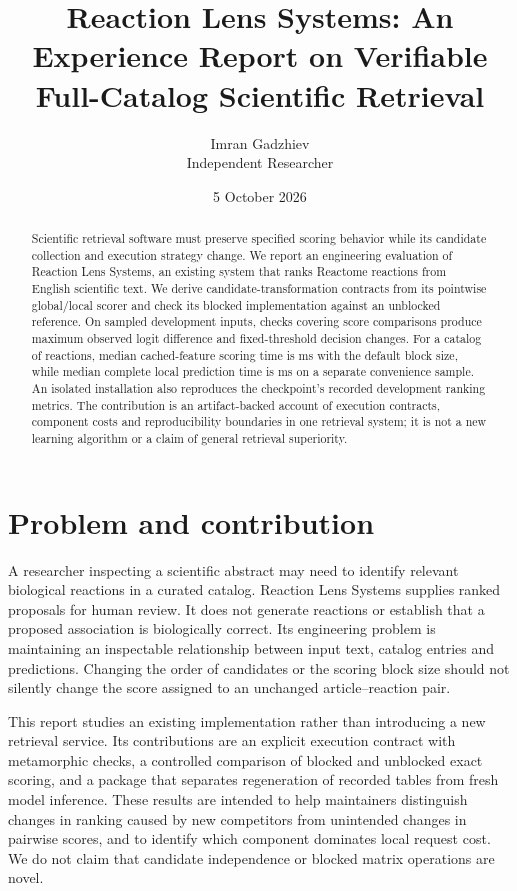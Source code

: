 \documentclass[11pt,a4paper]{article}
\title{Reaction Lens Systems: An Experience Report on Verifiable Full-Catalog Scientific Retrieval}
\author{Imran Gadzhiev\\Independent Researcher}
\date{5 October 2026}
\begin{document}
\maketitle
\begin{abstract}
Scientific retrieval software must preserve specified scoring behavior while its
candidate collection and execution strategy change. We report an engineering
evaluation of Reaction Lens Systems, an existing system that ranks Reactome reactions from
English scientific text. We derive candidate-transformation contracts from its
pointwise global/local scorer and check its blocked implementation against an
unblocked reference. On sampled development inputs, \ContractChecks{} checks
covering \ScoreComparisons{} score comparisons produce maximum observed logit
difference \MaxError{} and \DecisionFlips{} fixed-threshold decision changes.
For a catalog of \CatalogCount{} reactions, median cached-feature scoring time is
\DefaultMedian{} ms with the default block size, while median complete local
prediction time is \EndMedian{} ms on a separate convenience sample. An isolated
installation also reproduces the checkpoint's recorded development ranking metrics.
The contribution is an artifact-backed account of execution contracts, component
costs and reproducibility boundaries in one retrieval system; it is not a new
learning algorithm or a claim of general retrieval superiority.
\end{abstract}
{\small\noindent\repositorynotice}
\section{Problem and contribution}
A researcher inspecting a scientific abstract may need to identify relevant
biological reactions in a curated catalog. Reaction Lens Systems supplies ranked proposals
for human review. It does not generate reactions or establish that a proposed
association is biologically correct. Its engineering problem is maintaining an
inspectable relationship between input text, catalog entries and predictions.
Changing the order of candidates or the scoring block size should not silently
change the score assigned to an unchanged article--reaction pair.

This report studies an existing implementation rather than introducing a new
retrieval service. Its contributions are an explicit execution contract with
metamorphic checks, a controlled comparison of blocked and unblocked exact
scoring, and a package that separates regeneration of recorded tables from fresh
model inference. These results are intended to help maintainers distinguish
changes in ranking caused by new competitors from unintended changes in pairwise
scores, and to identify which component dominates local request cost.
We do not claim that candidate independence or blocked matrix operations are novel.
\end{document}
